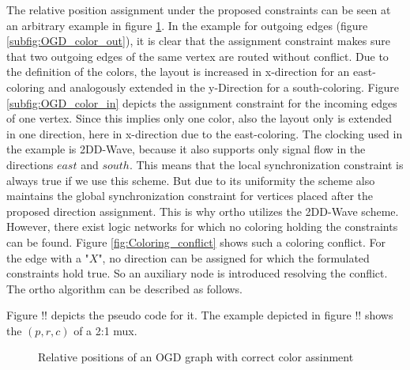 The relative position assignment under the proposed constraints can be seen at an arbitrary example in figure \ref{fig:OGD_color}. In the example for outgoing edges (figure \ref{subfig:OGD_color_out}), it is clear that the assignment constraint makes sure that two outgoing edges of the same vertex are routed without conflict. Due to the definition of the colors, the layout is increased in x-direction for an east-coloring and analogously extended in the y-Direction for a south-coloring. Figure \ref{subfig:OGD_color_in} depicts the assignment constraint for the incoming edges of one vertex. Since this implies only one color, also the layout only is extended in one direction, here in x-direction due to the east-coloring. The clocking used in the example is 2DD-Wave, because it also supports only signal flow in the directions $east$ and $south$. This means that the local synchronization constraint is always true if we use this scheme. But due to its uniformity the scheme also maintains the global synchronization constraint for vertices placed after the proposed direction assignment. This is why ortho utilizes the 2DD-Wave scheme. However, there exist logic networks for which no coloring holding the constraints can be found. Figure \ref{fig:Coloring_conflict} shows such a coloring conflict. For the edge with a "$X$", no direction can be assigned for which the formulated constraints hold true. So an auxiliary node is introduced resolving the conflict.\\
The ortho algorithm can be described as follows. 

Figure !! depicts the pseudo code for it.
The example depicted in figure !! shows the $(p, r, c)$ of a 2:1 mux.

\begin{figure}
	\centering
	
	\caption{Relative positions of an OGD graph with correct color assinment}\label{fig:OGD_color}
\end{figure}

